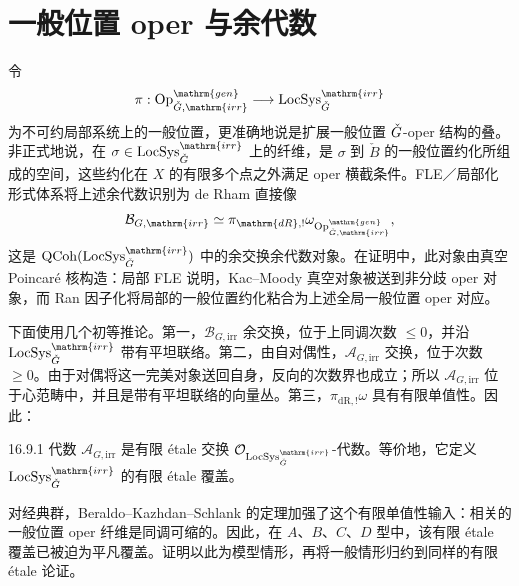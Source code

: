 \section{一般位置 oper 与余代数}\label{sec:16.9}
令
\[\pi:\Op^{\mathrm{gen}}_{\checkG,\mathrm{irr}}\longrightarrow\LocSys^{\mathrm{irr}}_{\checkG}\]
为不可约局部系统上的一般位置，更准确地说是扩展一般位置 $\check{G}$-oper 结构的叠。非正式地说，在 $\sigma\in\LocSys^{\mathrm{irr}}_{\checkG}$ 上的纤维，是 $\sigma$ 到 $\check B$ 的一般位置约化所组成的空间，这些约化在 $X$ 的有限多个点之外满足 oper 横截条件。FLE／局部化形式体系将上述余代数识别为 de Rham 直接像\cite{ABC24a,GR24b}
\[\mathcal B_{G,\mathrm{irr}}\simeq\pi_{\mathrm{dR},!}\omega_{\Op^{\mathrm{gen}}_{\checkG,\mathrm{irr}}},\]
这是 $\QCoh(\LocSys^{\mathrm{irr}}_{\checkG})$ 中的余交换余代数对象。在证明中，此对象由真空 Poincaré 核构造：局部 FLE 说明，Kac–Moody 真空对象被送到非分歧 oper 对象，而 Ran 因子化将局部的一般位置约化粘合为上述全局一般位置 oper 对应。

下面使用几个初等推论。第一，$\mathcal B_{G,\mathrm{irr}}$ 余交换，位于上同调次数 $\le0$，并沿 $\LocSys^{\mathrm{irr}}_{\checkG}$ 带有平坦联络。第二，由自对偶性，$\mathcal A_{G,\mathrm{irr}}$ 交换，位于次数 $\ge0$。由于对偶将这一完美对象送回自身，反向的次数界也成立；所以 $\mathcal A_{G,\mathrm{irr}}$ 位于心范畴中，并且是带有平坦联络的向量丛。第三，$\pi_{\mathrm{dR},!}\omega$ 具有有限单值性。因此：
\begin{theorem}{}{16.9.1}
代数 $\mathcal A_{G,\mathrm{irr}}$ 是有限 étale 交换 $\cO_{\LocSys^{\mathrm{irr}}_{\checkG}}$-代数。等价地，它定义 $\LocSys^{\mathrm{irr}}_{\checkG}$ 的有限 étale 覆盖。
\end{theorem}
\begin{note}
对经典群，Beraldo–Kazhdan–Schlank 的定理加强了这个有限单值性输入：相关的一般位置 oper 纤维是同调可缩的\cite{BKS18}。因此，在 $A$、$B$、$C$、$D$ 型中，该有限 étale 覆盖已被迫为平凡覆盖。证明以此为模型情形，再将一般情形归约到同样的有限 étale 论证。
\end{note}

